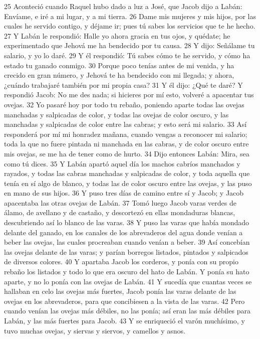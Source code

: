 25 Aconteció cuando Raquel hubo dado a luz a José, que Jacob dijo a Labán: Envíame, e iré a mi lugar, y a mi tierra.
26 Dame mis mujeres y mis hijos, por las cuales he servido contigo, y déjame ir; pues tú sabes los servicios que te he hecho.
27 Y Labán le respondió: Halle yo ahora gracia en tus ojos, y quédate; he experimentado que Jehová me ha bendecido por tu causa.
28 Y dijo: Señálame tu salario, y yo lo daré.
29 Y él respondió: Tú sabes cómo te he servido, y cómo ha estado tu ganado conmigo.
30 Porque poco tenías antes de mi venida, y ha crecido en gran número, y Jehová te ha bendecido con mi llegada; y ahora, ¿cuándo trabajaré también por mi propia casa?
31 Y él dijo: ¿Qué te daré? Y respondió Jacob: No me des nada; si hicieres por mí esto, volveré a apacentar tus ovejas.
32 Yo pasaré hoy por todo tu rebaño, poniendo aparte todas las ovejas manchadas y salpicadas de color, y todas las ovejas de color oscuro, y las manchadas y salpicadas de color entre las cabras; y esto será mi salario.
33 Así responderá por mí mi honradez mañana, cuando vengas a reconocer mi salario; toda la que no fuere pintada ni manchada en las cabras, y de color oscuro entre mis ovejas, se me ha de tener como de hurto.
34 Dijo entonces Labán: Mira, sea como tú dices.
35 Y Labán apartó aquel día los machos cabríos manchados y rayados, y todas las cabras manchadas y salpicadas de color, y toda aquella que tenía en sí algo de blanco, y todas las de color oscuro entre las ovejas, y las puso en mano de sus hijos.
36 Y puso tres días de camino entre sí y Jacob; y Jacob apacentaba las otras ovejas de Labán.
37 Tomó luego Jacob varas verdes de álamo, de avellano y de castaño, y descortezó en ellas mondaduras blancas, descubriendo así lo blanco de las varas.
38 Y puso las varas que había mondado delante del ganado, en los canales de los abrevaderos del agua donde venían a beber las ovejas, las cuales procreaban cuando venían a beber.
39 Así concebían las ovejas delante de las varas; y parían borregos listados, pintados y salpicados de diversos colores.
40 Y apartaba Jacob los corderos, y ponía con su propio rebaño los listados y todo lo que era oscuro del hato de Labán. Y ponía su hato aparte, y no lo ponía con las ovejas de Labán.
41 Y sucedía que cuantas veces se hallaban en celo las ovejas más fuertes, Jacob ponía las varas delante de las ovejas en los abrevaderos, para que concibiesen a la vista de las varas.
42 Pero cuando venían las ovejas más débiles, no las ponía; así eran las más débiles para Labán, y las más fuertes para Jacob.
43 Y se enriqueció el varón muchísimo, y tuvo muchas ovejas, y siervas y siervos, y camellos y asnos.

